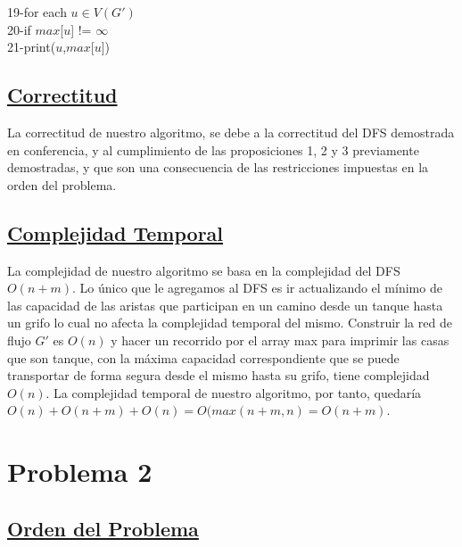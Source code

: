 \documentclass{article}
\begin{document}
\begin{algorithm}
        19-\hspace*{1em}for each $u \in V(G')$\\
        20-\hspace*{2em}if $max$[$u$] != $\infty$\\
        21-\hspace*{3em}print($u$,$max$[$u$])\\
        
    \end{algorithm}

    \subsection{\underline{Correctitud}}

    La correctitud de nuestro algoritmo, se debe a la correctitud del DFS demostrada en conferencia, y al cumplimiento de las proposiciones 
    1, 2 y 3 previamente demostradas, y que son una consecuencia de las restricciones impuestas en la orden del problema.\\

    \subsection{\underline{Complejidad Temporal}}
    La complejidad de nuestro algoritmo se basa en la complejidad del DFS $O(n + m)$. Lo \'unico que le agregamos al DFS
    es ir actualizando  el m\'inimo de las capacidad de las aristas que participan en un camino desde un tanque hasta un 
    grifo lo cual no afecta la complejidad temporal del mismo. Construir la red de flujo $G'$ es $O(n)$ y hacer un recorrido por el array max
    para imprimir las casas que son tanque, con la m\'axima capacidad correspondiente que se puede transportar de forma segura 
    desde el mismo hasta su grifo, tiene complejidad $O(n)$. La complejidad temporal de nuestro algoritmo, por tanto, quedar\'ia $O(n) + O(n + m) + O(n) 
    = O(max(n + m, n) = O(n + m)$.



    \newpage 

    \section{Problema 2} 

    \subsection{\underline{Orden del Problema}}
    
\end{document}

